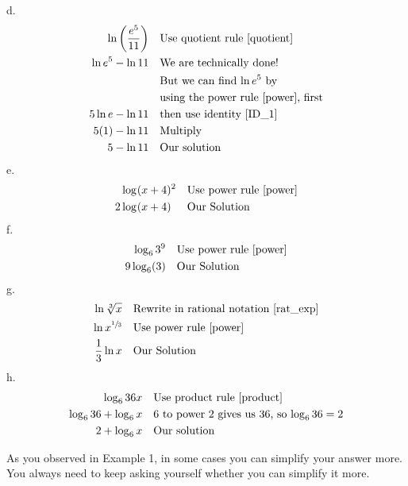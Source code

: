 %
d.   \begin{align*}
		\ln{\left(\frac{e^5}{11}\right)}&	&   &\text{Use quotient rule \eqref{quotient}}\\
		\ln{e^5}-\ln{11}&          &   &\text{We are technically done!} \\
		                          &&   &\text{But we can find $\ln{e^5}$ by}\\
		                          &&   &\text{using the power rule \eqref{power}, first}\\
		5\ln{e}-\ln{11}&   &    &\text{then use identity \eqref{ID_1}}\\
		5(1)-\ln{11}&   &       &\text{Multiply}\\
		5-\ln{11}&      &       &\text{Our solution}\\	
     \end{align*}
%
e.    \begin{align*}
		\log_{}(x+4)&^2		&       &\text{Use power rule \eqref{power}}\\
		2\log_{}(x+4)&      &       &\text{Our Solution}\\
	  \end{align*}
%
f.	  \begin{align*}
		\log_{6}3^9&		&       &\text{Use power rule \eqref{power}}\\
		9\log_{6}(3)&		&       &\text{Our Solution}\\
	  \end{align*}
%
g.	  \begin{align*}
		\ln{\sqrt[3]{x}}&			&&\text{Rewrite in rational notation \eqref{rat_exp}}\\
		\ln{{x}^{\sfrac{1}{3}}}&	&&\text{Use power rule \eqref{power}}\\
		\frac{1}{3} \ln{x}&		    &&\text{Our Solution}\\
	 \end{align*}
%
h.  \begin{align*}
		\log_{6}{36x}&			    &&\text{Use product rule \eqref{product}}\\
		\log_{6}{36}+\log_{6}x&	    &&\text{6 to power 2 gives us 36, so $\log_{6}{36}=2$}\\
		2+\log_{6}x&                &&\text{Our solution}\\
	 \end{align*}
\begin{nt}
As you observed in Example 1, in some cases you can simplify your answer more. You always 
need to keep asking yourself whether you can simplify it more.
\end{nt}

